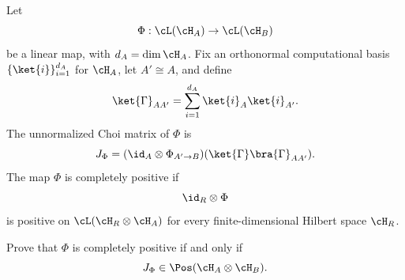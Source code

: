 Let
$$
\Phi:\cL(\cH_A)\to\cL(\cH_B)
$$
be a linear map, with $d_A=\dim\cH_A$. Fix an orthonormal computational basis
$\{\ket{i}\}_{i=1}^{d_A}$ for $\cH_A$, let $A'\cong A$, and define
$$
\ket{\Gamma}_{AA'}=\sum_{i=1}^{d_A}\ket{i}_A\ket{i}_{A'}.
$$
The unnormalized Choi matrix of $\Phi$ is
$$
J_{\Phi}
=
(\id_A\otimes\Phi_{A'\to B})
(\ket{\Gamma}\bra{\Gamma}_{AA'}).
$$
The map $\Phi$ is completely positive if
$$
\id_R\otimes\Phi
$$
is positive on $\cL(\cH_R\otimes\cH_A)$ for every finite-dimensional Hilbert space $\cH_R$.

Prove that $\Phi$ is completely positive if and only if
$$
J_{\Phi}\in\Pos(\cH_A\otimes\cH_B).
$$

